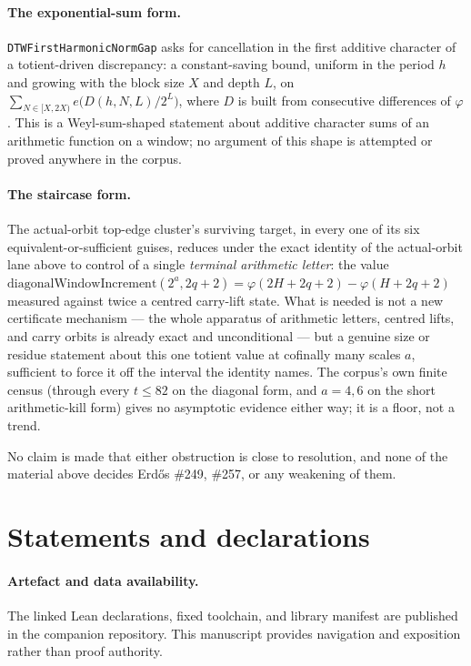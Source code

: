 \paragraph{The exponential-sum form.} \texttt{DTWFirstHarmonicNormGap} asks
for cancellation in the first additive character of a totient-driven
discrepancy: a constant-saving bound, uniform in the period $h$ and growing
with the block size $X$ and depth $L$, on
$\sum_{N\in[X,2X)} e\bigl(D(h,N,L)/2^L\bigr)$, where $D$ is built from
consecutive differences of $\varphi$. This is a Weyl-sum-shaped statement
about additive character sums of an arithmetic function on a window; no
argument of this shape is attempted or proved anywhere in the corpus.

\paragraph{The staircase form.} The actual-orbit top-edge cluster's surviving
target, in every one of its six equivalent-or-sufficient guises, reduces
under the exact identity of the actual-orbit lane above to control of a single \emph{terminal
arithmetic letter}: the value $\mathrm{diagonalWindowIncrement}(2^a,2q{+}2)
= \varphi(2H{+}2q{+}2)-\varphi(H{+}2q{+}2)$ measured against twice a centred
carry-lift state. What is needed is not a new certificate mechanism — the
whole apparatus of arithmetic letters, centred lifts, and carry orbits is
already exact and unconditional — but a genuine size or residue statement
about this one totient value at cofinally many scales $a$, sufficient to
force it off the interval the identity names. The corpus's own finite
census (through every $t\le82$ on the diagonal form, and $a=4,6$ on the short
arithmetic-kill form) gives no asymptotic evidence either way; it is a
floor, not a trend.

No claim is made that either obstruction is close to resolution, and none
of the material above decides Erdős \#249, \#257, or any weakening of them.

\clearpage
\section*{Statements and declarations}

\paragraph{Artefact and data availability.} The linked Lean declarations,
fixed toolchain, and library manifest are published in the companion
repository. This manuscript provides navigation and exposition rather than
proof authority.


